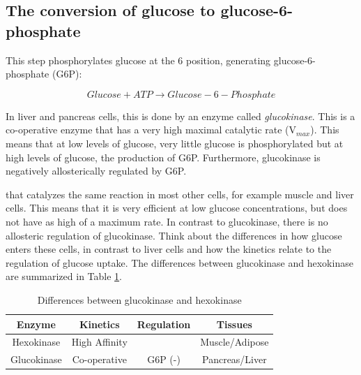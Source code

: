\documentclass{tufte-handout}
\begin{document}
\subsection{The conversion of glucose to glucose-6-phosphate}

   This step phosphorylates glucose at the 6 position, generating glucose-6-phosphate (G6P):

\begin{equation}\label{eq:glucokinase}
Glucose + ATP \rightarrow Glucose-6-Phosphate
\end{equation}

In liver and pancreas cells, this is done by an enzyme called \emph{glucokinase}.  This is a co-operative enzyme that has a very high maximal catalytic rate (V$_{max}$).  This means that at low levels of glucose, very little glucose is phosphorylated but at high levels of glucose, the production of G6P.  Furthermore, glucokinase is negatively allosterically regulated by G6P.

 that catalyzes the same reaction in most other cells, for example muscle and liver cells.  This means that it is very efficient at low glucose concentrations, but does not have as high of a maximum rate.  In contrast to glucokinase, there is no allosteric regulation of glucokinase.  Think about the differences in how glucose enters these cells, in contrast to liver cells and how the kinetics relate to the regulation of glucose uptake.  The differences between glucokinase and hexokinase are summarized in Table \ref{tab:glucokinase}.

\begin{table}
\centering
\caption{Differences between glucokinase and hexokinase}
\label{tab:glucokinase}
\begin{tabular}{cccc}
\hline
\textbf {Enzyme} & \textbf{Kinetics}  & \textbf{Regulation}  & \textbf{Tissues}\\
\hline
Hexokinase & High Affinity & & Muscle/Adipose\\
Glucokinase & Co-operative & G6P (-) & Pancreas/Liver\\

\hline
\end{tabular}
\end{table}
\end{document}

